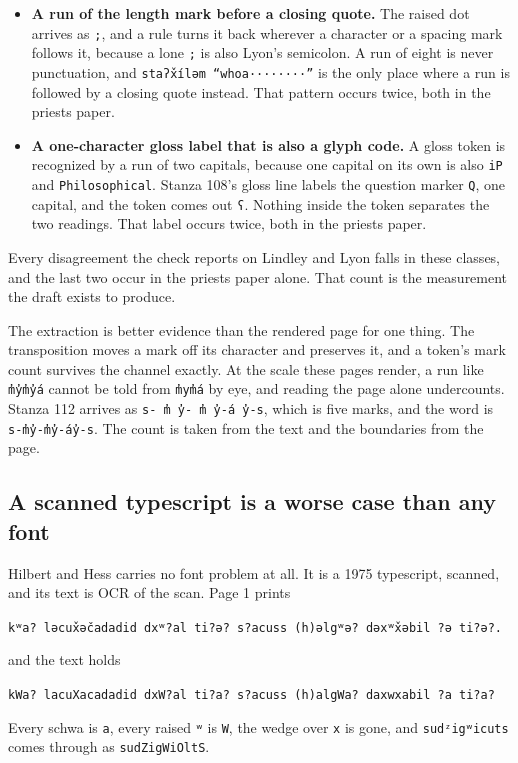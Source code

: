 \begin{itemize}
\item \textbf{A run of the length mark before a closing quote.} The raised dot arrives as \texttt{;}, and a rule turns it back wherever a character or a spacing mark follows it, because a lone \texttt{;} is also Lyon's semicolon. A run of eight is never punctuation, and \texttt{staʔx̌íləm “whoa········”} is the only place where a run is followed by a closing quote instead. That pattern occurs twice, both in the priests paper.
\item \textbf{A one-character gloss label that is also a glyph code.} A gloss token is recognized by a run of two capitals, because one capital on its own is also \texttt{iP} and \texttt{Philosophical}. Stanza 108's gloss line labels the question marker \texttt{Q}, one capital, and the token comes out \texttt{ʕ}. Nothing inside the token separates the two readings. That label occurs twice, both in the priests paper.
\end{itemize}

Every disagreement the check reports on Lindley and Lyon falls in these classes, and the last two occur in the priests paper alone. That count is the measurement the draft exists to produce.

The extraction is better evidence than the rendered page for one thing. The transposition moves a mark off its character and preserves it, and a token's mark count survives the channel exactly. At the scale these pages render, a run like \texttt{m̓y̓m̓y̓á} cannot be told from \texttt{m̓ym̓á} by eye, and reading the page alone undercounts. Stanza 112 arrives as \texttt{s- m̓ y̓- m̓ y̓-á y̓-s}, which is five marks, and the word is \texttt{s-m̓y̓-m̓y̓-áy̓-s}. The count is taken from the text and the boundaries from the page.

\subsection{A scanned typescript is a worse case than any font}

Hilbert and Hess \cite{src:Hilbert-and-Hess-1975} carries no font problem at all. It is a 1975 typescript, scanned, and its text is OCR of the scan. Page 1 prints

\texttt{kʷa? ləcux̌əčadadid dxʷ?al ti?ə? s?acuss (h)əlgʷə? dəxʷx̌əbil ?ə ti?ə?.}

and the text holds

\texttt{kWa? lacuXacadadid dxW?al ti?a? s?acuss (h)algWa? daxwxabil ?a ti?a?}

Every schwa is \texttt{a}, every raised \texttt{ʷ} is \texttt{W}, the wedge over \texttt{x} is gone, and \texttt{sudᶻigʷicuts} comes through as \texttt{sudZigWiOltS}.

